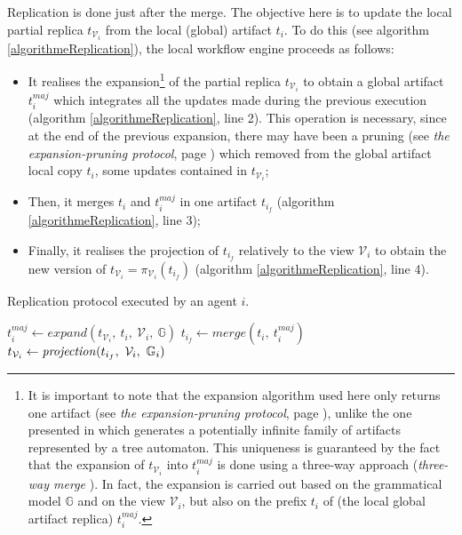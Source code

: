 Replication is done just after the merge. The objective here is to update the local partial replica $t_{\mathcal{V}_{i}}$ from the local (global) artifact $t_i$.
To do this (see algorithm \ref{algorithmeReplication}), the local workflow engine proceeds as follows:
\begin{itemize}
	\item It realises the expansion\footnote{It is important to note that the expansion algorithm used here only returns one artifact (see \textit{the expansion-pruning protocol}, page \pageref{chap3:sec:execution-protocol-expansion-pruning}), unlike the one presented in \cite{badouelTchoupeCmcs} which generates a potentially infinite family of artifacts represented by a tree automaton. This uniqueness is guaranteed by the fact that the expansion of $t_{\mathcal{V}_{i}}$ into $t^{maj}_i$ is done using a three-way approach (\textit{three-way merge} \cite{tomMens}). In fact, the expansion is carried out based on the grammatical model $\mathbb{G}$ and on the view $\mathcal{V}_{i}$, but also on the prefix $t_i$ of (the local global artifact replica) $t^{maj}_i$.} of the partial replica $t _{\mathcal{V}_{i}}$ to obtain a global artifact $t^{maj}_i$ which integrates all the updates made during the previous execution (algorithm \ref{algorithmeReplication}, line 2). This operation is necessary, since at the end of the previous expansion, there may have been a pruning (see \textit{the expansion-pruning protocol}, page \pageref{chap3:sec:execution-protocol-expansion-pruning}) which removed from the global artifact local copy $t_i$, some updates contained in $t_{\mathcal{V}_{i}}$;
	\item Then, it merges $t_i$ and $t^{maj}_i$ in one artifact $t_{i_f}$ (algorithm \ref{algorithmeReplication}, line 3);
	\item Finally, it realises the projection of $t_{i_f}$ relatively to the view $\mathcal{V}_{i}$ to obtain the new version of $t_{\mathcal{V}_{i}}=\pi_{\mathcal{V}_i}(t_{i_f})$ (algorithm \ref{algorithmeReplication}, line 4).
\end{itemize}

\begin{algorithm}
\small
\caption{Replication protocol executed by an agent $i$.\label{algorithmeReplication}}
\begin{algorithmic}[1]
		\State $t^{maj}_i \gets expand(t_{\mathcal{V}_{i}}, ~t_i, ~\mathcal{V}_{i}, ~\mathbb{G})$
		\State $t_{i_f} \gets merge(t_i,~t^{maj}_i)$
		\State $t_{\mathcal{V}_{i}} \gets \textrm{\textit{projection}}(t_{i_f}, ~\mathcal{V}_{i}, ~\mathbb{G}_{i})$
	\EndProcedure
\end{algorithmic}
\end{algorithm}

